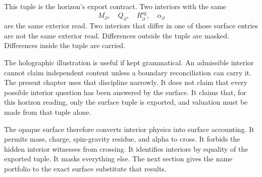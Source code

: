 This tuple is the horizon's export contract. Two interiors with the same
\[
  M_{\partial},\quad Q_{\partial},\quad
  R^{\mathrm{sg}}_{\partial},\quad \alpha_{\partial}
\]
are the same exterior read. Two interiors that differ in one of those
surface entries are not the same exterior read. Differences outside the
tuple are masked. Differences inside the tuple are carried.

The holographic illustration is useful if kept grammatical. An admissible
interior cannot claim independent content unless a boundary reconciliation
can carry it. The present chapter uses that discipline narrowly. It does
not claim that every possible interior question has been answered by the
surface. It claims that, for this horizon reading, only the surface tuple is
exported, and valuation must be made from that tuple alone.

The opaque surface therefore converts interior physics into surface
accounting. It permits mass, charge, spin-gravity residue, and alpha to
cross. It forbids the hidden interior witnesses from crossing. It identifies
interiors by equality of the exported tuple. It masks everything else. The
next section gives the name portfolio to the exact surface substitute that
results.
